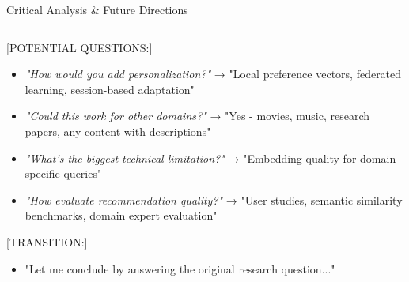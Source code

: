 \begin{frame}{Critical Analysis \& Future Directions}
{\begin{columns}[T]
    \begin{column}{0.49\textwidth}

      [POTENTIAL QUESTIONS:]
      \begin{itemize}
        \item \textit{"How would you add personalization?"} → "Local preference vectors, federated learning, session-based adaptation"
        \item \textit{"Could this work for other domains?"} → "Yes - movies, music, research papers, any content with descriptions"
        \item \textit{"What's the biggest technical limitation?"} → "Embedding quality for domain-specific queries"
        \item \textit{"How evaluate recommendation quality?"} → "User studies, semantic similarity benchmarks, domain expert evaluation"
      \end{itemize}
      
      \vspace{0.2cm}
      [TRANSITION:]
      \begin{itemize}
        \item "Let me conclude by answering the original research question..."
      \end{itemize}
    \end{column}
  \end{columns}
}

\end{frame}